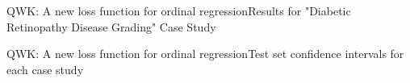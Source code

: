 \documentclass{beamer}
\begin{document}
\begin{frame}{QWK: A new loss function for ordinal regression}{Results for "Diabetic Retinopathy Disease Grading" Case Study}	
\begin{figure}[p]
\end{figure}
\end{frame}

\begin{frame}{QWK: A new loss function for ordinal regression}{Test set confidence intervals for each case study}	
\begin{figure}[p]
\end{figure}
\end{frame}
\end{document}

